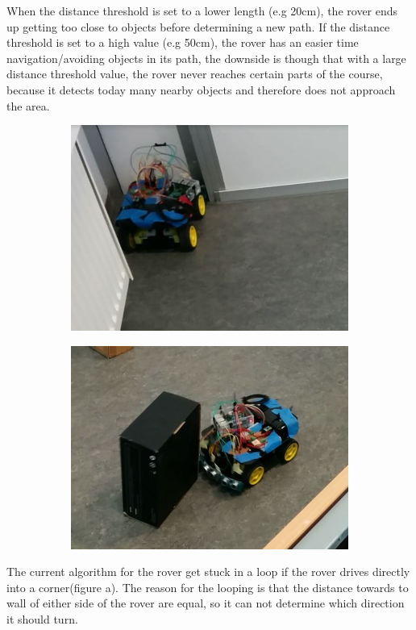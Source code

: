 When the distance threshold is set to a lower length (e.g 20cm), the rover ends up getting too close to objects before determining a new path. If the distance threshold is set to a high value (e.g 50cm), the rover has an easier time navigation/avoiding objects in its path, the downside is though that with a large distance threshold value, the rover never reaches certain parts of the course, because it detects today many nearby objects and therefore does not approach the area.

\begin{figure}[H]
	\centering
	\begin{subfigure}[H]{0.4\textwidth}
		\includegraphics[width=\textwidth]{images/test-stuckincorner.jpg}
		\subcaption{}
	\end{subfigure}%
	\quad
	\begin{subfigure}[H]{0.4\textwidth}
		\includegraphics[width=\textwidth]{images/test-badmeasuringangle.jpg}
		\subcaption{}
	\end{subfigure}
\end{figure}

The current algorithm for the rover get stuck in a loop if the rover drives directly into a corner(figure a). The reason for the looping is that the distance towards to wall of either side of the rover are equal, so it can not determine which direction it should turn.\\